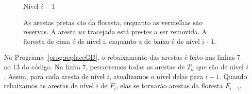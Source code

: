 \begin{figure}[H]
\begin{minipage}[c]{0.8\textwidth}
\begin{tikzpicture}
        \end{tikzpicture}
    \end{minipage}
    \vspace{1cm}
        \noindent
    \begin{minipage}[c]{2cm}
        \raggedright
        Nível $i - 1$
    \end{minipage}%
    \begin{minipage}[c]{0.8\textwidth}
        \centering
    \end{minipage}
    \caption{As arestas pretas são da floresta, enquanto as vermelhas são reservas. A aresta $uv$ tracejada está prestes a ser removida. A floresta de cima é de nível i, enquanto a de baixo é de nível i - 1.}
    \vspace{-1cm}
    \label{fig:example-removal-part1}
\end{figure}

No Programa~\ref{prog:replaceGD}, o rebaixamento das arestas é feito nas linhas $7$ ao $13$ do código. Na linha $7$, percorremos todas as arestas de $T_u$ que são de nível $i$. Assim, para cada aresta de nível $i$, atualizamos o nível delas para $i - 1$. Quando rebaixamos as arestas de nível $i$ de $F_i$, elas se tornarão arestas da floresta $F_{i-1}$. 

